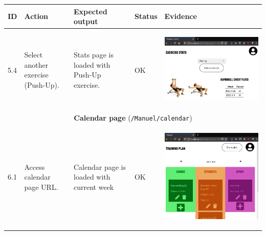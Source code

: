 \documentclass[12pt,twoside,titlepage,a4paper]{article}
\theoremstyle{definicion}
\theoremstyle{lema}
\theoremstyle{teorema}
\theoremstyle{corolario}
\theoremstyle{ejemplo}
\theoremstyle{nota}
\begin{document}
\begin{table}[!h]
	\centering
	\begin{tabular}{|m{0.6cm}|m{2.9cm}|m{3.6cm}|m{1.1cm}|m{5.9cm}|}
		\hline
		\textbf{ID} & \textbf{Action} & \textbf{Expected output} & \textbf{Status} & \textbf{Evidence} \\ 
		\hline
		5.4 & Select another exercise (Push-Up). & Stats page is loaded with Push-Up exercise. & OK &
		\begin{center}\includegraphics[scale=0.22]{stats2.png}\end{center} \\
		\hline
		\multicolumn{5}{|c|}{\textbf{Calendar page} (\texttt{/Manuel/calendar})} \\ 
		\hline
		6.1 & Access calendar page URL. & Calendar page is loaded with current week & OK &
		\begin{center}\includegraphics[scale=0.22]{calendar1.png}\end{center} \\

\end{tabular}
\end{table}
\end{document}
